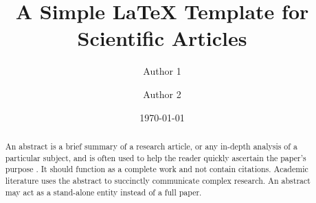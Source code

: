 \documentclass[a4paper,10pt]{article}
\title{A Simple LaTeX Template for Scientific Articles}
\author[1]{Author 1}
\affil[1]{Organization Name}
\author{Author 2}
\date{\today}
\begin{document}
%
\maketitle

\begin{abstract}
    An abstract is a brief summary of a research article, or any in-depth analysis of a particular subject, and is often used to help the reader quickly ascertain the paper's purpose \cite{techwrite}.
    It should function as a complete work and not contain citations.
    Academic literature uses the abstract to succinctly communicate complex research. An abstract may act as a stand-alone entity instead of a full paper.
\end{abstract}

\end{document}
